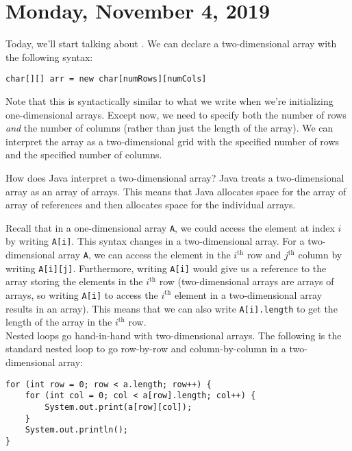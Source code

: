 \section{Monday, November 4, 2019}

Today, we'll start talking about . We can declare a two-dimensional array with the following syntax:

\begin{center}
    \verb!char[][] arr = new char[numRows][numCols]!
\end{center}

Note that this is syntactically similar to what we write when we're initializing one-dimensional arrays. Except now, we need to specify both the number of rows \textit{and} the number of columns (rather than just the length of the array). We can interpret the array as a two-dimensional grid with the specified number of rows and the specified number of columns. 


How does Java interpret a two-dimensional array? Java treats a two-dimensional array as an array of arrays. This means that Java allocates space for the array of array of references and then allocates space for the individual arrays. 

Recall that in a one-dimensional array \verb!A!, we could access the element at index $i$ by writing \verb!A[i]!. This syntax changes in a two-dimensional array. For a two-dimensional array \verb!A!, we can access the element in the $i^{\text{th}}$ row and $j^{\text{th}}$ column by writing \verb!A[i][j]!. Furthermore, writing \verb!A[i]! would give us a reference to the array storing the elements in the $i^{\text{th}}$ row (two-dimensional arrays are arrays of arrays, so writing \verb!A[i]! to access the $i^{\text{th}}$ element in a two-dimensional array results in an array). This means that we can also write \verb!A[i].length! to get the length of the array in the $i^{\text{th}}$ row. \\

Nested loops go hand-in-hand with two-dimensional arrays. The following is the standard nested loop to go row-by-row and column-by-column in a two-dimensional array:

\begin{lstlisting}
for (int row = 0; row < a.length; row++) {
    for (int col = 0; col < a[row].length; col++) {
        System.out.print(a[row][col]);
    }
    System.out.println();
}
\end{lstlisting}

